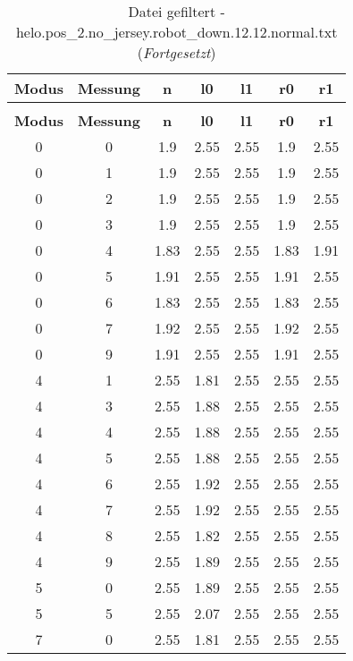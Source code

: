 \clearpage{}
\begin{longtable}{|c|c||c||c|c||c|c|}
	\caption{Datei gefiltert - helo.pos\_2.no\_jersey.robot\_down.12.12.normal.txt} \label{tab:helo.pos-2.no-jersey.robot-down.12.12.normal.txt} \\ \hline
	\textbf{Modus} & \textbf{Messung} & \textbf{n} & \textbf{l0} & \textbf{l1} & \textbf{r0} & \textbf{r1}\\ \hline
	\endfirsthead
	\caption[]{Datei gefiltert - helo.pos\_2.no\_jersey.robot\_down.12.12.normal.txt (\emph{Fortgesetzt})} \\ \hline
	\textbf{Modus} & \textbf{Messung} & \textbf{n} & \textbf{l0} & \textbf{l1} & \textbf{r0} & \textbf{r1}\\ \hline
	\endhead
	0 & 0 & 1.9 & 2.55 & 2.55 & 1.9 & 2.55 \\ \hline
	0 & 1 & 1.9 & 2.55 & 2.55 & 1.9 & 2.55 \\ \hline
	0 & 2 & 1.9 & 2.55 & 2.55 & 1.9 & 2.55 \\ \hline
	0 & 3 & 1.9 & 2.55 & 2.55 & 1.9 & 2.55 \\ \hline
	0 & 4 & 1.83 & 2.55 & 2.55 & 1.83 & 1.91 \\ \hline
	0 & 5 & 1.91 & 2.55 & 2.55 & 1.91 & 2.55 \\ \hline
	0 & 6 & 1.83 & 2.55 & 2.55 & 1.83 & 2.55 \\ \hline
	0 & 7 & 1.92 & 2.55 & 2.55 & 1.92 & 2.55 \\ \hline
	0 & 9 & 1.91 & 2.55 & 2.55 & 1.91 & 2.55 \\ \hline
	4 & 1 & 2.55 & 1.81 & 2.55 & 2.55 & 2.55 \\ \hline
	4 & 3 & 2.55 & 1.88 & 2.55 & 2.55 & 2.55 \\ \hline
	4 & 4 & 2.55 & 1.88 & 2.55 & 2.55 & 2.55 \\ \hline
	4 & 5 & 2.55 & 1.88 & 2.55 & 2.55 & 2.55 \\ \hline
	4 & 6 & 2.55 & 1.92 & 2.55 & 2.55 & 2.55 \\ \hline
	4 & 7 & 2.55 & 1.92 & 2.55 & 2.55 & 2.55 \\ \hline
	4 & 8 & 2.55 & 1.82 & 2.55 & 2.55 & 2.55 \\ \hline
	4 & 9 & 2.55 & 1.89 & 2.55 & 2.55 & 2.55 \\ \hline
	5 & 0 & 2.55 & 1.89 & 2.55 & 2.55 & 2.55 \\ \hline
	5 & 5 & 2.55 & 2.07 & 2.55 & 2.55 & 2.55 \\ \hline
	7 & 0 & 2.55 & 1.81 & 2.55 & 2.55 & 2.55 \\ \hline

\end{longtable}
